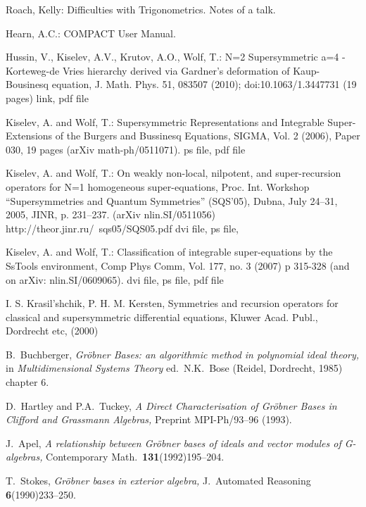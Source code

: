\begin{thebibliography}{999}

Roach, Kelly: Difficulties with Trigonometrics. Notes of a talk.

Hearn, A.C.: COMPACT User Manual.


Hussin, V., Kiselev, A.V., Krutov, A.O., Wolf, T.: N=2 Supersymmetric a=4 -
Korteweg-de Vries hierarchy derived via Gardner's deformation of
Kaup-Bousinesq equation, J. Math. Phys. 51, 083507 (2010);
doi:10.1063/1.3447731 (19 pages) link, pdf file

Kiselev, A. and Wolf, T.: Supersymmetric Representations and Integrable
Super-Extensions of the Burgers and Bussinesq Equations, SIGMA, Vol. 2 (2006),
Paper 030, 19 pages (arXiv math-ph/0511071). ps file, pdf file

Kiselev, A. and Wolf, T.: On weakly non-local, nilpotent, and super-recursion
operators for N=1 homogeneous super-equations, Proc. Int. Workshop
``Supersymmetries and Quantum Symmetries'' (SQS'05), Dubna, July 24--31, 2005,
JINR, p. 231--237. (arXiv nlin.SI/0511056)
http://theor.jinr.ru/~sqs05/SQS05.pdf dvi file, ps file,

Kiselev, A. and Wolf, T.: Classification of integrable super-equations by the
SsTools environment, Comp Phys Comm, Vol. 177, no. 3 (2007) p 315-328 (and on
arXiv: nlin.SI/0609065). dvi file, ps file, pdf file

I. S. Krasil'shchik, P. H. M. Kersten, Symmetries and recursion operators for
classical and supersymmetric differential equations, Kluwer Acad. Publ.,
Dordrecht etc, (2000) 


	B.~Buchberger, {\em
	Gr{\"o}bner Bases: an algorithmic method in polynomial ideal theory,}
	in {\em Multidimensional Systems Theory\/} ed.~N.K.~Bose
	(Reidel, Dordrecht, 1985) chapter 6.

	D.~Hartley and P.A.~Tuckey, {\em
	A Direct Characterisation of Gr{\"o}bner Bases in Clifford and
	Grassmann Algebras,}
	Preprint MPI-Ph/93--96 (1993).

	J.~Apel, {\em A relationship between Gr{\"o}bner bases of ideals and
	vector modules of G-algebras,}
	Contemporary Math.~\textbf{131}(1992)195--204.

	T.~Stokes, {\em
	Gr{\"o}bner bases in exterior algebra,}
	J.~Automated Reasoning \textbf{6}(1990)233--250.


\end{thebibliography}
